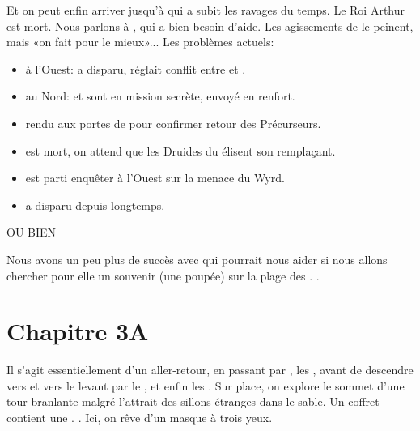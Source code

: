 \documentclass[11pt]{article}
\begin{document}
Et on peut enfin arriver jusqu'à \newcamelot{}  qui a subit les ravages du temps. Le Roi Arthur est mort. Nous parlons à \lancelot{}, qui a bien besoin d'aide. Les agissements de \gaheris{} le peinent, mais «on fait pour le mieux»... Les problèmes actuels:
\begin{itemize}
\item à l'Ouest: \bors{} a disparu, réglait conflit entre \nidcorbeaux{} et \boismuraille{}.
\item au Nord: \bedivere{} et \palamede{} sont en mission secrète, \gauvain{} envoyé en renfort.
\item \agravain{} rendu aux portes de \tuathan{} pour confirmer retour des Précurseurs.
\item \geraint{} est mort, on attend que les Druides du \cerclelunaire{} élisent son remplaçant.
\item \lamorak{} est parti enquêter à l'Ouest sur la menace du Wyrd.
\item \galaad{} a disparu depuis longtemps.
\end{itemize}


OU BIEN


Nous avons un peu plus de succès avec \morgane{} qui pourrait nous aider si nous allons chercher pour elle un souvenir (une poupée) sur la plage des \chatoyantes{}.  .


\section{Chapitre 3A}
Il s'agit essentiellement d'un aller-retour, en passant par \bourgpacif{}, les \marchestitan{}, \tordracine{} avant de descendre vers \blanc{} et vers le levant par le \premierfort{}, \noirbourbe{} et enfin les \chatoyantes{} . Sur place, on explore le sommet d'une tour branlante malgré l'attrait des sillons étranges dans le sable. Un coffret contient une \poupee{}. . Ici, on rêve d'un masque à trois yeux.
\end{document}
